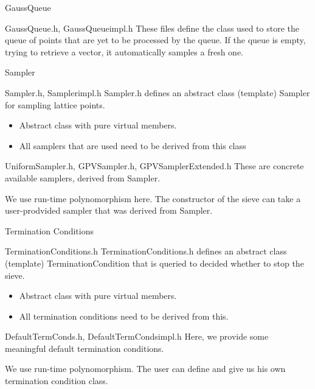 \documentclass{beamer}
\begin{document}
\begin{frame}{GaussQueue}
\begin{block}{GaussQueue.h, GaussQueue\textunderscore impl.h}
These files define the class used to store the queue of points that are yet to be processed by the queue.
If the queue is empty, trying to retrieve a vector, it automatically samples a fresh one.
\end{block}
\end{frame}

\begin{frame}{Sampler}
\begin{block}{Sampler.h, Sampler\textunderscore impl.h}
Sampler.h defines an abstract class (template) Sampler for sampling lattice points.
\begin{itemize}
\item Abstract class with pure virtual members.
\item All samplers that are used need to be derived from this class
\end{itemize}
\end{block}
\begin{block}{UniformSampler.h, GPVSampler.h, GPVSamplerExtended.h}
These are concrete available samplers, derived from Sampler.
\end{block}
We use run-time polynomorphism here. The constructor of the sieve can take a user-prodvided sampler that was derived from Sampler.
\end{frame}

\begin{frame}{Termination Conditions}
\begin{block}{TerminationConditions.h}
TerminationConditions.h defines an abstract class (template) TerminationCondition that is queried to decided whether to stop the sieve.
\begin{itemize}
 \item Abstract class with pure virtual members.
 \item All termination conditions need to be derived from this.
\end{itemize}
\end{block}
\begin{block}{DefaultTermConds.h, DefaultTermConds\textunderscore impl.h}
Here, we provide some meaningful default termination conditions.
\end{block}
We use run-time polynomorphism. The user can define and give us his own termination condition class.
\end{frame}
\end{document}
